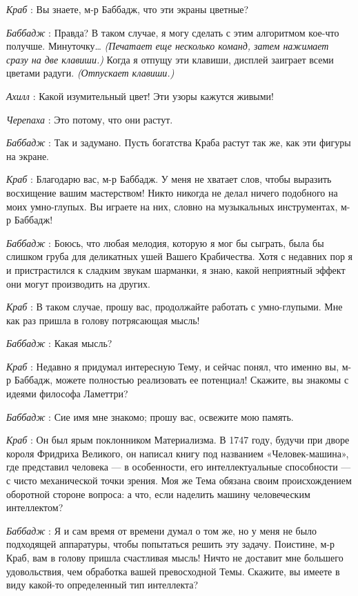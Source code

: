 \emph{Краб} : Вы знаете, м-р Баббадж, что эти экраны цветные?

\emph{Баббадж} : Правда? В таком случае, я могу сделать с этим алгоритмом кое-что получше. Минуточку\ldots{} \emph{(Печатает еще несколько команд, затем нажимает сразу на две клавиши.)} Когда я отпущу эти клавиши, дисплей заиграет всеми цветами радуги. \emph{(Отпускает клавиши.)}

\emph{Ахилл} : Какой изумительный цвет! Эти узоры кажутся живыми!

\emph{Черепаха} : Это потому, что они растут.

\emph{Баббадж} : Так и задумано. Пусть богатства Краба растут так же, как эти фигуры на экране.

\emph{Краб} : Благодарю вас, м-р Баббадж. У меня не хватает слов, чтобы выразить восхищение вашим мастерством! Никто никогда не делал ничего подобного на моих умно-глупых. Вы играете на них, словно на музыкальных инструментах, м-р Баббадж!

\emph{Баббадж} : Боюсь, что любая мелодия, которую я мог бы сыграть, была бы слишком груба для деликатных ушей Вашего Крабичества. Хотя с недавних пор я и пристрастился к сладким звукам шарманки, я знаю, какой неприятный эффект они могут производить на других.

\emph{Краб} : В таком случае, прошу вас, продолжайте работать с умно-глупыми. Мне как раз пришла в голову потрясающая мысль!

\emph{Баббадж} : Какая мысль?

\emph{Краб} : Недавно я придумал интересную Тему, и сейчас понял, что именно вы, м-р Баббадж, можете полностью реализовать ее потенциал! Скажите, вы знакомы с идеями философа Ламеттри?

\emph{Баббадж} : Сие имя мне знакомо; прошу вас, освежите мою память.

\emph{Краб} : Он был ярым поклонником Материализма. В 1747 году, будучи при дворе короля Фридриха Великого, он написал книгу под названием «Человек-машина», где представил человека --- в особенности, его интеллектуальные способности --- с чисто механической точки зрения. Моя же Тема обязана своим происхождением оборотной стороне вопроса: а что, если наделить машину человеческим интеллектом?

\emph{Баббадж} : Я и сам время от времени думал о том же, но у меня не было подходящей аппаратуры, чтобы попытаться решить эту задачу. Поистине, м-р Краб, вам в голову пришла счастливая мысль! Ничто не доставит мне большего удовольствия, чем обработка вашей превосходной Темы. Скажите, вы имеете в виду какой-то определенный тип интеллекта?

